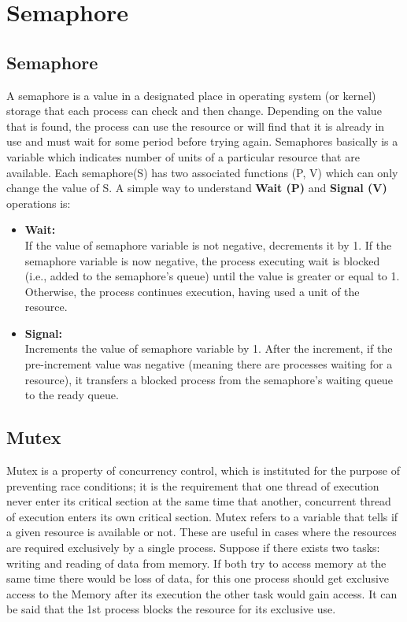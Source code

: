 \documentclass{article}
\begin{document}
\section{Semaphore}
\subsection{Semaphore}
A semaphore is a value in a designated place in operating system (or kernel) storage that each process can check and then change. Depending on the value that is found, the process can use the resource or will find that it is already in use and must wait for some period before trying again.
Semaphores basically is a variable which indicates number of units of a particular resource that are available. Each semaphore(S) has two associated functions (P, V) which can only change the value of S.
A simple way to understand \textbf{Wait (P)} and \textbf{Signal (V)} operations is:
\begin{itemize}
    
\item\textbf {Wait:}\\ 
If the value of semaphore variable is not negative, decrements it by 1. If the semaphore variable is now negative, the process executing wait is blocked (i.e., added to the semaphore's queue) until the value is greater or equal to 1. Otherwise, the process continues execution, having used a unit of the resource.
\item\textbf {Signal:}\\
Increments the value of semaphore variable by 1. After the increment, if the pre-increment value was negative (meaning there are processes waiting for a resource), it transfers a blocked process from the semaphore's waiting queue to the ready queue.
\end{itemize}
\subsection{Mutex}
Mutex is a property of concurrency control, which is instituted for the purpose of preventing race conditions; it is the requirement that one thread of execution never enter its critical section at the same time that another, concurrent thread of execution enters its own critical section.
Mutex refers to a variable that tells if a given resource is available or not. These are useful in cases where the resources are required exclusively by a single process. Suppose if there exists two tasks: writing and reading of data from memory. If both try to access memory at the same time there would be loss of data, for this one process should get exclusive access to the Memory after its execution the other task would gain access. It can be said that the 1st process blocks the resource for its exclusive use.
\end{document}
